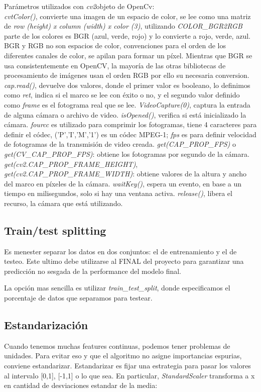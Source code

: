 \documentclass[twoside,11pt]{article}
\begin{document}
Parámetros utilizados con \textit{cv2}objeto de OpenCv:\\
\textit{cvtColor()}, convierte una imagen de un espacio de color, se lee como una matriz 
de \textit{row (height) x column (width) x color (3)}, utilizando \textit{COLOR\_BGR2RGB} 
parte de los colores es BGR (azul, verde, rojo) y lo convierte a rojo, verde, azul. 
BGR y RGB no son espacios de color, convenciones para el orden de los diferentes canales 
de color, se apilan para formar un píxel. Mientras que BGR se usa consistentemente en OpenCV, 
la mayoría de las otras bibliotecas de procesamiento de imágenes usan el orden RGB por ello 
su necesaria conversion.
\textit{cap.read()}, devuelve dos valores, donde el primer valor es booleano, lo definimos 
como \textit{ret}, indica si el marco se lee con éxito o no, y el segundo valor definido 
como \textit{frame} es el fotograma real que se lee.
\textit{VideoCapture(0)}, captura la entrada de alguna cámara o archivo de video.
\textit{isOpened()}, verifica si está inicializado la cámara.
\textit{fourcc} es utilizado para comprimir los fotogramas, tiene 4 caracteres para definir 
el códec, ('P','I','M','1') es un códec MPEG-1; \textit{fps} es para definir velocidad de 
fotogramas de la transmisión de video creada.
\textit{get(CAP\_PROP\_FPS)} o \textit{get(CV\_CAP\_PROP\_FPS)}: obtiene los fotogramas por segundo de la cámara.
\textit{get(cv2.CAP\_PROP\_FRAME\_HEIGHT)}, \textit{get(cv2.CAP\_PROP\_FRAME\_WIDTH)}: obtiene valores 
de la altura y ancho del marco en píxeles de la cámara.
\textit{waitKey()}, espera un evento, en base a un tiempo en milisegundos, solo si hay una ventana activa.
\textit{release()}, libera el recurso, la cámara que está utilizando.

\subsection{Train/test splitting}
Es menester separar los datos en dos conjuntos: 
el de entrenamiento y el de testeo. Este ultimo debe 
utilizarse al FINAL del proyecto para garantizar una 
predicción no sesgada de la performance del modelo final.

La opción mas sencilla es utilizar \textit{train\_test\_split}, donde especificamos el porcentaje 
de datos que separamos para testear.

\subsection{Estandarización}
Cuando tenemos muchas features continuas, podemos tener problemas de unidades. 
Para evitar eso y que el algoritmo no asigne importancias espurias, conviene estandarizar. 
Estandarizar es fijar una estrategia para pasar los valores al intervalo [0,1], [-1,1] o lo que sea.
En particular,  \textit{StandardScaler} transforma a x en cantidad de desviaciones estandar de la media:
\end{document}
